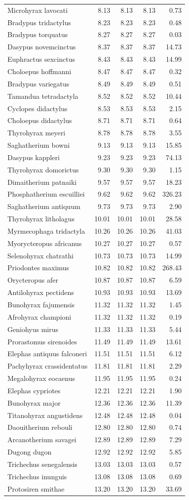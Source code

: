 \documentclass[10pt,letterpaper]{article}
\begin{document}
\begin{longtable}[]{@{}lrrrr@{}}
Microhyrax lavocati & 8.13 & 8.13 & 8.13 & 0.73\tabularnewline
Bradypus tridactylus & 8.23 & 8.23 & 8.23 & 0.48\tabularnewline
Bradypus torquatus & 8.27 & 8.27 & 8.27 & 0.03\tabularnewline
Dasypus novemcinctus & 8.37 & 8.37 & 8.37 & 14.73\tabularnewline
Euphractus sexcinctus & 8.43 & 8.43 & 8.43 & 14.99\tabularnewline
Choloepus hoffmanni & 8.47 & 8.47 & 8.47 & 0.32\tabularnewline
Bradypus variegatus & 8.49 & 8.49 & 8.49 & 0.51\tabularnewline
Tamandua tetradactyla & 8.52 & 8.52 & 8.52 & 10.44\tabularnewline
Cyclopes didactylus & 8.53 & 8.53 & 8.53 & 2.15\tabularnewline
Choloepus didactylus & 8.71 & 8.71 & 8.71 & 0.64\tabularnewline
Thyrohyrax meyeri & 8.78 & 8.78 & 8.78 & 3.55\tabularnewline
Saghatherium bowni & 9.13 & 9.13 & 9.13 & 15.85\tabularnewline
Dasypus kappleri & 9.23 & 9.23 & 9.23 & 74.13\tabularnewline
Thyrohyrax domorictus & 9.30 & 9.30 & 9.30 & 1.15\tabularnewline
Dimaitherium patnaiki & 9.57 & 9.57 & 9.57 & 18.23\tabularnewline
Phosphatherium escuilliei & 9.62 & 9.62 & 9.62 & 326.23\tabularnewline
Saghatherium antiquum & 9.73 & 9.73 & 9.73 & 2.90\tabularnewline
Thyrohyrax litholagus & 10.01 & 10.01 & 10.01 & 28.58\tabularnewline
Myrmecophaga tridactyla & 10.26 & 10.26 & 10.26 & 41.03\tabularnewline
Myorycteropus africanus & 10.27 & 10.27 & 10.27 & 0.57\tabularnewline
Selenohyrax chatrathi & 10.73 & 10.73 & 10.73 & 14.99\tabularnewline
Priodontes maximus & 10.82 & 10.82 & 10.82 & 268.43\tabularnewline
Orycteropus afer & 10.87 & 10.87 & 10.87 & 6.59\tabularnewline
Antilohyrax pectidens & 10.93 & 10.93 & 10.93 & 13.69\tabularnewline
Bunohyrax fajumensis & 11.32 & 11.32 & 11.32 & 1.45\tabularnewline
Afrohyrax championi & 11.32 & 11.32 & 11.32 & 0.19\tabularnewline
Geniohyus mirus & 11.33 & 11.33 & 11.33 & 5.44\tabularnewline
Prorastomus sirenoides & 11.49 & 11.49 & 11.49 & 13.61\tabularnewline
Elephas antiquus falconeri & 11.51 & 11.51 & 11.51 & 6.12\tabularnewline
Pachyhyrax crassidentatus & 11.81 & 11.81 & 11.81 & 2.29\tabularnewline
Megalohyrax eocaenus & 11.95 & 11.95 & 11.95 & 0.24\tabularnewline
Elephas cypriotes & 12.21 & 12.21 & 12.21 & 1.90\tabularnewline
Bunohyrax major & 12.36 & 12.36 & 12.36 & 11.39\tabularnewline
Titanohyrax angustidens & 12.48 & 12.48 & 12.48 & 0.04\tabularnewline
Daouitherium rebouli & 12.80 & 12.80 & 12.80 & 0.74\tabularnewline
Arcanotherium savagei & 12.89 & 12.89 & 12.89 & 7.29\tabularnewline
Dugong dugon & 12.92 & 12.92 & 12.92 & 5.85\tabularnewline
Trichechus senegalensis & 13.03 & 13.03 & 13.03 & 0.57\tabularnewline
Trichechus inunguis & 13.08 & 13.08 & 13.08 & 0.69\tabularnewline
Protosiren smithae & 13.20 & 13.20 & 13.20 & 33.69\tabularnewline

\end{longtable}
\end{document}
